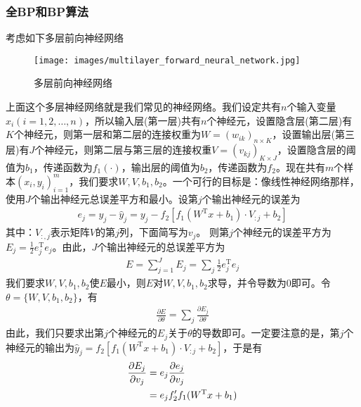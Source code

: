         \subsubsection{全BP和BP算法}
            \par
            考虑如下多层前向神经网络
            \begin{figure}[H]
            \centering
            \texttt{[image: images/multilayer\_forward\_neural\_network.jpg]}
            \caption{多层前向神经网络}
            \end{figure}
            上面这个多层神经网络就是我们常见的神经网络。我们设定共有$n$个输入变量$x_i(i=1,2,\dots,n)$，所以输入层(第一层)共有$n$个神经元，设置隐含层(第二层)有$K$个神经元，则第一层和第二层的连接权重为$W = (w_{ik})_{n\times K}$，设置输出层(第三层)有$J$个神经元，则第二层与第三层的连接权重$V = (v_{kj})_{K\times J}$，设置隐含层的阈值为$b_1$，传递函数为$f_1(\cdot)$，输出层的阈值为$b_2$，传递函数为$f_2$。现在共有$m$个样本$(x_i,y_i)_{i=1}^m$，我们要求$W,V,b_1,b_2$。一个可行的目标是：像线性神经网络那样，使用$J$个输出神经元总误差平方和最小。设第$j$个输出神经元的误差为
            \begin{align*}
            e_j = y_j - \hat{y}_j = y_j - f_2 \left[ f_1(W^\mathrm{T}x+b_1)\cdot V_{:j} + b_2  \right]
            \end{align*}
            其中：$V_{:,j}$表示矩阵$V$的第$j$列，下面简写为$v_j$。
            则第$j$个神经元的误差平方为$E_j = \frac{1}{2}e_j^\mathrm{T}e_j$。由此，$J$个输出神经元的总误差平方为
            \begin{align*}
            E= \sum_{j=1}^J E_j = \sum_j \frac{1}{2}e_j^\mathrm{T}e_j
            \end{align*}
            我们要求$W,V,b_1,b_2$使$E$最小，则$E$对$W,V,b_1,b_2$求导，并令导数为0即可。令$\theta = \{W,V,b_1,b_2\}$，有
            \begin{align*}
            \frac{\partial E}{\partial \theta} = \sum_j \frac{\partial E_j}{\partial \theta}
            \end{align*}
            由此，我们只要求出第$j$个神经元的$E_j$关于$\theta$的导数即可。一定要注意的是，第$j$个神经元的输出为$\hat{y}_j =f_2 \left[ f_1(W^\mathrm{T}x+b_1)\cdot V_{:j} + b_2  \right]$，于是有
            \begin{align}
            \label{全BP导数计算公式1}
            \frac{\partial E_j}{\partial v_j} &= e_j\frac{\partial e_j}{\partial v_j} \notag \\
            &= e_j f_2'f_1(W^\mathrm{T}x+b_1)
            \end{align}
